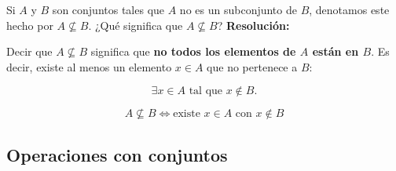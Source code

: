 \documentclass[a4paper,12pt]{article}
\begin{document}
\begin{ejercicio}[title=Ejercicio 9]
Si $A$ y $B$ son conjuntos tales que $A$ no es un subconjunto de $B$, denotamos este hecho por $A\not\subseteq B$.
¿Qué significa que $A\not\subseteq B$?
\tcblower
\textbf{Resolución:}

Decir que $A\not\subseteq B$ significa que \textbf{no todos los elementos de $A$ están en $B$}.  
Es decir, existe al menos un elemento $x \in A$ que no pertenece a $B$:

\[
\exists x \in A \text{ tal que } x \notin B.
\]

\[
\boxed{A\not\subseteq B \iff \text{existe } x\in A \text{ con } x\notin B}
\]

\end{ejercicio}

\subsection{Operaciones con conjuntos}
\end{document}
